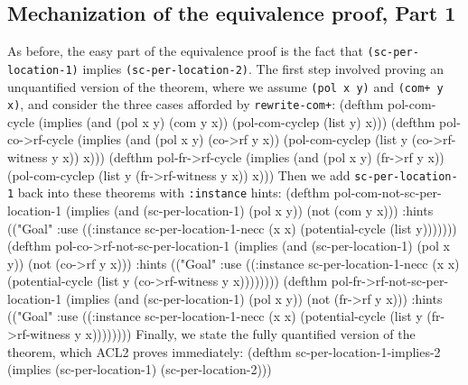 \documentclass[]{eptcs}
\newenvironment{qv}
{\quote\Verbatim}
{\endVerbatim\endquote}
\begin{document}
\subsection{Mechanization of the equivalence proof, Part 1}
As before, the easy part of the equivalence proof is the fact that \verb|(sc-per-location-1)| implies \linebreak\verb|(sc-per-location-2)|. The first step involved proving an unquantified version of the theorem, where we assume \verb|(pol x y)| and \verb|(com+ y x)|, and consider the three cases afforded by \verb|rewrite-com+|:
\begin{qv}
(defthm pol-com-cycle
  (implies (and (pol x y)
                (com y x))
           (pol-com-cyclep (list y) x)))
(defthm pol-co->rf-cycle
  (implies (and (pol x y)
                (co->rf y x))
           (pol-com-cyclep (list y (co->rf-witness y x)) x)))
(defthm pol-fr->rf-cycle
  (implies (and (pol x y)
                (fr->rf y x))
           (pol-com-cyclep (list y (fr->rf-witness y x)) x)))
\end{qv}
Then we add \verb|sc-per-location-1| back into these theorems with \verb|:instance| hints:
\begin{qv}
(defthm pol-com-not-sc-per-location-1
  (implies (and (sc-per-location-1)
                (pol x y))
           (not (com y x)))
  :hints (("Goal"
           :use ((:instance sc-per-location-1-necc
                            (x x)
                            (potential-cycle (list y)))))))
(defthm pol-co->rf-not-sc-per-location-1
  (implies (and (sc-per-location-1)
                (pol x y))
           (not (co->rf y x)))
  :hints (("Goal"
           :use ((:instance sc-per-location-1-necc
                  (x x)
                  (potential-cycle (list y (co->rf-witness y x))))))))
(defthm pol-fr->rf-not-sc-per-location-1
  (implies (and (sc-per-location-1)
                (pol x y))
           (not (fr->rf y x)))
  :hints (("Goal"
           :use ((:instance sc-per-location-1-necc
                  (x x)
                  (potential-cycle (list y (fr->rf-witness y x))))))))
\end{qv}
Finally, we state the fully quantified version of the theorem, which ACL2 proves immediately:
\begin{qv}
(defthm sc-per-location-1-implies-2
  (implies (sc-per-location-1)
           (sc-per-location-2)))
\end{qv}
\end{document}
